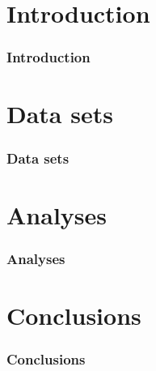 \section{Introduction}
\begin{frame}
	\frametitle{Introduction}
\end{frame}
\section{Data sets}
\begin{frame}
	\frametitle{Data sets}
\end{frame}
\section{Analyses}
\begin{frame}
	\frametitle{Analyses}
\end{frame}
\section{Conclusions}
\begin{frame}
	\frametitle{Conclusions}
\end{frame}

% 
